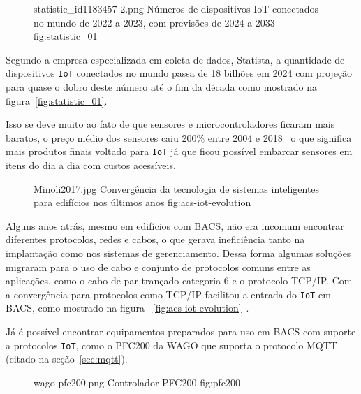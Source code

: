 \begin{figure}[H]
    {statistic_id1183457-2.png}                 %
    {Números de dispositivos IoT conectados no mundo de 2022 a 2023, com previsões de 2024 a 2033}     %
    {fig:statistic_01}                      %
\end{figure}

Segundo a empresa especializada em coleta de dados, Statista, 
a quantidade de dispositivos \verb'IoT' conectados no mundo passa de 18 bilhões em 
2024 com projeção para quase o dobro deste número até o fim da década 
\cite{statista-iot-connected-devices} como mostrado na figura~\ref{fig:statistic_01}. 

Isso se deve muito ao fato de que sensores e microcontroladores ficaram mais baratos, o 
preço médio dos sensores caiu 200\% entre 2004 e 2018~\cite{microsoft1} o que significa
mais produtos finais voltado para \verb'IoT' já que ficou possível embarcar sensores em itens 
do dia a dia com custos acessíveis.

\begin{figure}[H]
    {Minoli2017.jpg}                 %
    {Convergência da tecnologia de sistemas inteligentes para edifícios nos últimos anos}     %
    {fig:acs-iot-evolution}                      %
\end{figure}

Alguns anos atrás, mesmo em edifícios com BACS, não era incomum encontrar diferentes protocolos, 
redes e cabos, o que gerava ineficiência tanto na implantação como nos sistemas de gerenciamento. 
Dessa forma algumas soluções migraram para o uso de cabo e conjunto de protocolos comuns entre as 
aplicações, como o cabo de par trançado categoria 6 e o protocolo TCP/IP.
Com a convergência para protocolos como TCP/IP facilitou a entrada do \verb'IoT' em BACS, 
como mostrado na figura 
~\ref{fig:acs-iot-evolution}~\cite{Minoli2017}.

Já é possível encontrar equipamentos preparados para uso em BACS com suporte a protocolos \verb'IoT',
como o PFC200 da WAGO que suporta o protocolo MQTT (citado na seção~\ref{sec:mqtt}).

\begin{figure}[H]
    {wago-pfc200.png}                 %
    {Controlador PFC200}     %
    {fig:pfc200}                      %
\end{figure}